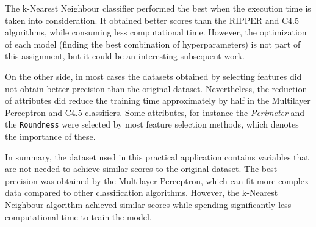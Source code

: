 \documentclass[a4paper,11pt]{article}
\begin{document}
The k-Nearest Neighbour classifier performed the best when the execution time is taken into consideration. It obtained better scores than the RIPPER and C4.5 algorithms, while consuming less computational time. However, the optimization of each model (finding the best combination of hyperparameters) is not part of this assignment, but it could be an interesting subsequent work.

On the other side, in most cases the datasets obtained by selecting features did not obtain better precision than the original dataset. Nevertheless, the reduction of attributes did reduce the training time approximately by half in the Multilayer Perceptron and C4.5 classifiers. Some attributes, for instance the \textit{Perimeter} and the \texttt{Roundness} were selected by most feature selection methods, which denotes the importance of these.

In summary, the dataset used in this practical application contains variables that are not needed to achieve similar scores to the original dataset. The best precision was obtained by the Multilayer Perceptron, which can fit more complex data compared to other classification algorithms. However, the k-Nearest Neighbour algorithm achieved similar scores while spending significantly less computational time to train the model.

\newpage


\end{document}
